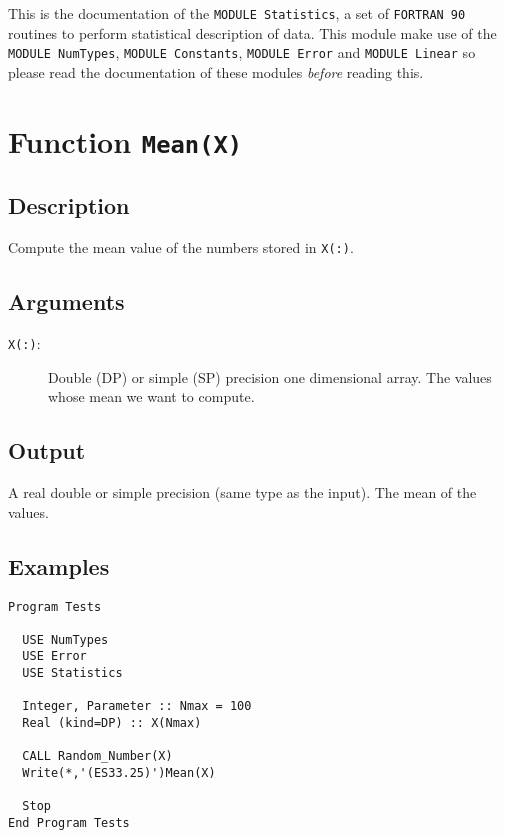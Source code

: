 This is the documentation of the \texttt{MODULE Statistics}, a set
of \texttt{FORTRAN 90} routines to perform statistical description
of data. This module make use of the \texttt{MODULE NumTypes},
\texttt{MODULE Constants}, \texttt{MODULE Error} and \texttt{MODULE
  Linear} so please read the documentation of these modules
\emph{before} reading this. 

\section{Function \texttt{Mean(X)}}

\subsection{Description}

Compute the mean value of the numbers stored in \texttt{X(:)}.

\subsection{Arguments}

\begin{description}
\item[\texttt{X(:)}:] Double (DP) or simple (SP) precision one
  dimensional array. The values  whose mean we want to compute.
\end{description}

\subsection{Output}

A real double or simple precision (same type as the input). The mean
of the values.

\subsection{Examples}

\begin{lstlisting}[emph=Mean,
                   emphstyle=\color{blue},
                   frame=trBL,
                   caption=Computing the Mean of a vector of numbers.,
                   label=mean]
Program Tests

  USE NumTypes
  USE Error
  USE Statistics

  Integer, Parameter :: Nmax = 100
  Real (kind=DP) :: X(Nmax)

  CALL Random_Number(X)
  Write(*,'(ES33.25)')Mean(X)

  Stop
End Program Tests
\end{lstlisting}

